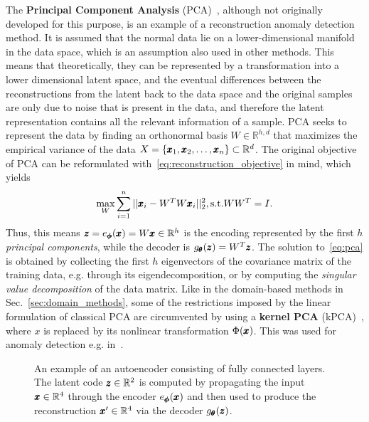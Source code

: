 The \textbf{Principal Component Analysis} (PCA)~\cite{shyu2003novel,aggarwal2015outlier}, although not originally developed for this purpose, is an example of a reconstruction anomaly detection method. It is assumed that the normal data lie on a lower-dimensional manifold in the data space, which is an assumption also used in other methods. This means that theoretically, they can be represented by a transformation into a lower dimensional latent space, and the eventual differences between the reconstructions from the latent back to the data space and the original samples are only due to noise that is present in the data, and therefore the latent representation contains all the relevant information of a sample. PCA seeks to represent the data by finding an orthonormal basis $W \in \mathbb{R}^{h,d}$ that maximizes the empirical variance of the data $X= \lbrace \pmb{{x}}_1, \pmb{{x}}_2, \ldots, \pmb{{x}}_n \rbrace \subset \mathbb{R}^d$. The original objective of PCA can be reformulated with~\eqref{eq:reconstruction_objective} in mind, which yields 
\begin{equation} \label{eq:pca}
	\max_W \sum_{i=1}^n \vert \vert \pmb{{x}}_i -  W^TW \pmb{{x}}_i \vert \vert_2^2, \text{s.t.} WW^T = I.
\end{equation}
Thus, this means $\pmb{{z}} = e_{\pmb{{\phi}}}(\pmb{{x}}) = W \pmb{{x}} \in \mathbb{R}^h$ is the encoding represented by the first $h$ \textit{principal components}, while the decoder is $g_{\pmb{{\theta}}}(\pmb{{z}}) = W^T\pmb{{z}}$. The solution to~\eqref{eq:pca} is obtained by collecting the first $h$ eigenvectors of the covariance matrix of the training data, e.g. through its eigendecomposition, or by computing the \textit{singular value decomposition} of the data matrix. Like in the domain-based methods in Sec.~\ref{sec:domain_methods}, some of the restrictions imposed by the linear formulation of classical PCA are circumvented by using a \textbf{kernel PCA} (kPCA)~\cite{scholkopf1998nonlinear}, where $x$ is replaced by its nonlinear transformation $\Phi(\pmb{{x}})$. This was used for anomaly detection e.g. in~\cite{xiao2013l1}.

\begin{figure}
\begin{centering}

\par\end{centering}
\centering{}\caption{An example of an autoencoder consisting of fully connected layers. The latent code $\pmb{{z}}\in\mathbb{R}^{2}$ is computed by propagating the input $\pmb{{x}} \in\mathbb{R}^{4}$ through the encoder $e_{\pmb{{\phi}}}(\pmb{{x}})$ and then used to produce the reconstruction $\pmb{{x}}'\in\mathbb{R}^{4}$ via the decoder $g_{\pmb{{\theta}}}(\pmb{{z}})$.}
\label{fig:ae}
\end{figure}

